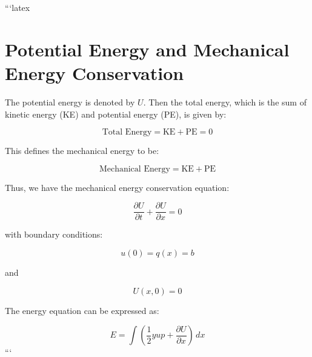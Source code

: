 ```latex
\section*{Potential Energy and Mechanical Energy Conservation}

The potential energy is denoted by \( U \). Then the total energy, which is the sum of kinetic energy (KE) and potential energy (PE), is given by:

\[
\text{Total Energy} = \text{KE} + \text{PE} = 0
\]

This defines the mechanical energy to be:

\[
\text{Mechanical Energy} = \text{KE} + \text{PE}
\]

Thus, we have the mechanical energy conservation equation:

\[
\frac{\partial U}{\partial t} + \frac{\partial U}{\partial x} = 0
\]

with boundary conditions:

\[
u(0) = q(x) = b
\]

and

\[
U(x, 0) = 0
\]

The energy equation can be expressed as:

\[
E = \int \left( \frac{1}{2} y u p + \frac{\partial U}{\partial x} \right) \, dx
\]
```
